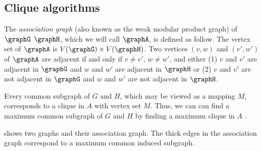 \subsection{Clique algorithms}

The \emph{association graph} (also known as the weak modular product graph)
of $\graphG$ $\graphH$, which we will call
$\graphA$, is defined as follow.  The vertex set of $\graphA$ is $V(\graphG)
\times V(\graphH)$.  Two vertices $(v,w)$ and $(v',w')$ of $\graphA$ are
adjacent if and only if $v \not= v'$, $w \not= w'$, and either (1) $v$ and $v'$
are adjacent in $\graphG$ and $w$ and $w'$ are adjacent in $\graphH$ or (2) $v$
and $v'$ are not adjacent in $\graphG$ and $w$ and $w'$ are not adjacent in
$\graphH$.

Every common subgraph of $G$ and $H$, which may be viewed as a mapping $M$,
corresponds to a clique in $A$ with vertex set $M$.  Thus, we can can find
a maximum common subgraph of $G$ and $H$ by finding a maximum clique in $A$
\citep{LeviG}.

 shows two graphs and their association graph.
The thick edges in the association graph correspond to a maximum common
induced subgraph.


